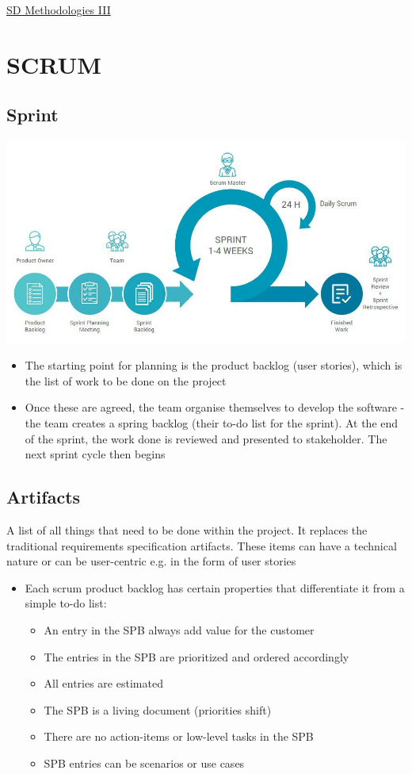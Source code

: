 \documentclass{article}[18pt]
\begin{document}
\begin{center}
\underline{\huge SD Methodologies III}
\end{center}
\section{SCRUM}
\subsection{Sprint}
\begin{center}
	\includegraphics[scale=0.7]{sprint}
\end{center}
\begin{itemize}
	\item The starting point for planning is the product backlog (user stories), which is the list of work to be done on the project
	\item Once these are agreed, the team organise themselves to develop the software - the team creates a spring backlog (their to-do list for the sprint). At the end of the sprint, the work done is reviewed and presented to stakeholder. The next sprint cycle then begins
\end{itemize}
\subsection{Artifacts}
\begin{defin}
	A list of all things that need to be done within the project. It replaces the traditional requirements specification artifacts. These items can have a technical nature or can be user-centric e.g. in the form of user stories
\end{defin}
\begin{itemize}
	\item Each scrum product backlog has certain properties that differentiate it from a simple to-do list:
	\begin{itemize}
		\item An entry in the SPB always add value for the customer
		\item The entries in the SPB are prioritized and ordered accordingly
		\item All entries are estimated
		\item The SPB is a living document (priorities shift)
		\item There are no action-items or low-level tasks in the SPB
		\item SPB entries can be scenarios or use cases
	\end{itemize}
\end{itemize}
\end{document}
